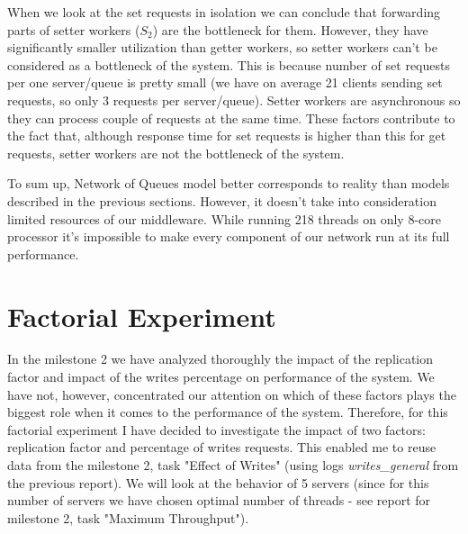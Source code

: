 \documentclass[11pt]{article}
\begin{document}
When we look at the set requests in isolation we can conclude that forwarding parts of setter workers ($S_2$) are the bottleneck for them. However, they have significantly smaller utilization than getter workers, so setter workers can't be considered as a bottleneck of the system. This is because number of set requests per one server/queue is pretty small (we have on average 21 clients sending set requests, so only 3 requests per server/queue). Setter workers are asynchronous so they can process couple of requests at the same time. These factors contribute to the fact that, although response time for set requests is higher than this for get requests, setter workers are not the bottleneck of the system.


To sum up, Network of Queues model better corresponds to reality than models described in the previous sections. However, it doesn't take into consideration limited resources of our middleware. While running 218 threads on only 8-core processor it's impossible to make every component of our network run at its full performance. 


\clearpage

\section{Factorial Experiment}\label{sec:2k-experiment}

In the milestone 2 we have analyzed thoroughly the impact of the replication factor and impact of the writes percentage on performance of the system. We have not, however, concentrated our attention on which of these factors plays the biggest role when it comes to the performance of the system. Therefore, for this factorial experiment I have decided to investigate the impact of two factors: replication factor and percentage of writes requests. This enabled me to reuse data from the milestone 2, task "Effect of Writes" (using logs {\it writes\_general} from the previous report). We will look at the behavior of 5 servers (since for this number of servers we have chosen optimal number of threads - see report for milestone 2, task "Maximum Throughput").
\end{document}

